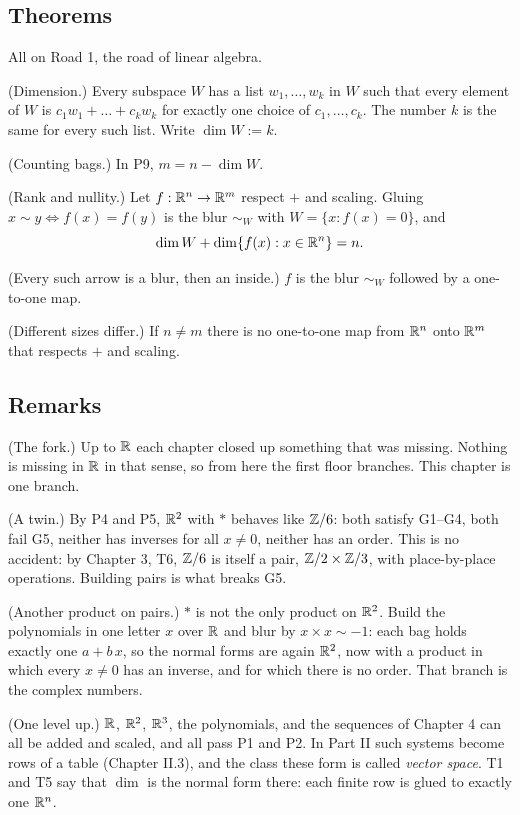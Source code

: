 \subsection*{Theorems}

All on Road 1, the road of linear algebra.
\begin{lines}
\item[\lab{T1}] (Dimension.) Every subspace $W$ has a list $w_1, \dots, w_k$ in $W$ such that every element of $W$ is $c_1 w_1 + \dots + c_k w_k$ for exactly one choice of $c_1, \dots, c_k$. The number $k$ is the same for every such list. Write $\dim W := k$.
\item[\lab{T2}] (Counting bags.) In P9, $m = n - \dim W$.
\item[\lab{T3}] (Rank and nullity.) Let $f : \mathbb{R}^n \to \mathbb{R}^m$ respect $+$ and scaling. Gluing $x \sim y \iff f(x) = f(y)$ is the blur $\sim_W$ with $W = \{x : f(x) = 0\}$, and
\[
\dim W + \dim \{f(x) : x \in \mathbb{R}^n\} = n .
\]
\item[\lab{T4}] (Every such arrow is a blur, then an inside.) $f$ is the blur $\sim_W$ followed by a one-to-one map.
\item[\lab{T5}] (Different sizes differ.) If $n \neq m$ there is no one-to-one map from $\mathbb{R}^n$ onto $\mathbb{R}^m$ that respects $+$ and scaling.
\end{lines}

\subsection*{Remarks}

\begin{lines}
\item[\lab{R1}] (The fork.) Up to $\mathbb{R}$ each chapter closed up something that was missing. Nothing is missing in $\mathbb{R}$ in that sense, so from here the first floor branches. This chapter is one branch.
\item[\lab{R2}] (A twin.) By P4 and P5, $\mathbb{R}^2$ with $\ast$ behaves like $\mathbb{Z}/6$: both satisfy G1--G4, both fail G5, neither has inverses for all $x \neq 0$, neither has an order. This is no accident: by Chapter 3, T6, $\mathbb{Z}/6$ is itself a pair, $\mathbb{Z}/2 \times \mathbb{Z}/3$, with place-by-place operations. Building pairs is what breaks G5.
\item[\lab{R3}] (Another product on pairs.) $\ast$ is not the only product on $\mathbb{R}^2$. Build the polynomials in one letter $x$ over $\mathbb{R}$ and blur by $x \times x \sim -1$: each bag holds exactly one $a + b\,x$, so the normal forms are again $\mathbb{R}^2$, now with a product in which every $x \neq 0$ has an inverse, and for which there is no order. That branch is the complex numbers.
\item[\lab{R4}] (One level up.) $\mathbb{R}$, $\mathbb{R}^2$, $\mathbb{R}^3$, the polynomials, and the sequences of Chapter 4 can all be added and scaled, and all pass P1 and P2. In Part II such systems become rows of a table (Chapter II.3), and the class these form is called \emph{vector space}. T1 and T5 say that $\dim$ is the normal form there: each finite row is glued to exactly one $\mathbb{R}^n$.
\end{lines}

